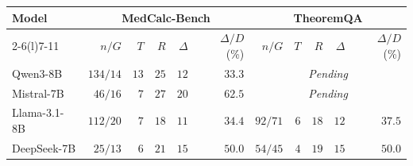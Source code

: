 \begin{tabular*}{\textwidth}{@{\extracolsep{\fill}}lrrrrrrrrrr@{}}
\toprule
Model & \multicolumn{5}{c}{MedCalc-Bench} & \multicolumn{5}{c}{TheoremQA} \\
\cmidrule(lr){2-6}\cmidrule(l){7-11}
 & $n/G$ & $T$ & $R$ & $\Delta$ & $\Delta/D$ (\%) & $n/G$ & $T$ & $R$ & $\Delta$ & $\Delta/D$ (\%) \\
\midrule
Qwen3-8B & $134/14$ & $13$ & $25$ & $12$ & $33.3$ & \multicolumn{5}{c}{\textit{Pending}} \\
Mistral-7B & $46/16$ & $7$ & $27$ & $20$ & $62.5$ & \multicolumn{5}{c}{\textit{Pending}} \\
Llama-3.1-8B & $112/20$ & $7$ & $18$ & $11$ & $34.4$ & $92/71$ & $6$ & $18$ & $12$ & $37.5$ \\
DeepSeek-7B & $25/13$ & $6$ & $21$ & $15$ & $50.0$ & $54/45$ & $4$ & $19$ & $15$ & $50.0$ \\
\bottomrule
\end{tabular*}
